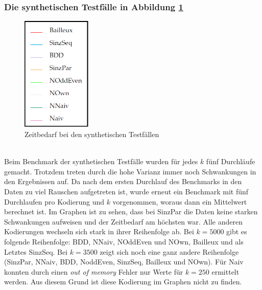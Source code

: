 \documentclass[a4,abstract=on]{scrartcl}
\begin{document}
\subsubsection*{Die synthetischen Testfälle in Abbildung \ref{fig:synth}}


\begin{figure}[htbp]
\includegraphics[width=3.3cm]{Legende.png}
\caption{Zeitbedarf bei den synthetischen Testfällen}
\label{fig:synth}
\end{figure}
\ \\
Beim Benchmark der synthetischen Testfälle wurden für jedes $k$ fünf Durchläufe gemacht. Trotzdem treten durch die hohe Varianz immer noch Schwankungen in den Ergebnissen auf. Da nach dem ersten Durchlauf des Benchmarks in den Daten zu viel Rauschen aufgetreten ist, wurde erneut ein Benchmark mit fünf Durchlaufen pro Kodierung und $k$ vorgenommen, woraus dann ein Mittelwert berechnet ist. Im Graphen ist zu sehen, dass bei SinzPar die Daten keine starken Schwankungen aufweisen und der Zeitbedarf am höchsten war. Alle anderen Kodierungen wechseln sich stark in ihrer Reihenfolge ab. Bei $k=5000$ gibt es folgende Reihenfolge: BDD, NNaiv, NOddEven und NOwn, Bailleux und als Letztes SinzSeq. Bei $k=3500$ zeigt sich noch eine ganz andere Reihenfolge (SinzPar, NNaiv, BDD, NoddEven, SinzSeq, Bailleux und NOwn). Für Naiv konnten durch einen \textit{out of memory} Fehler nur Werte für $k=250$ ermittelt werden. Aus diesem Grund ist diese Kodierung im Graphen nicht zu finden.
\end{document}
